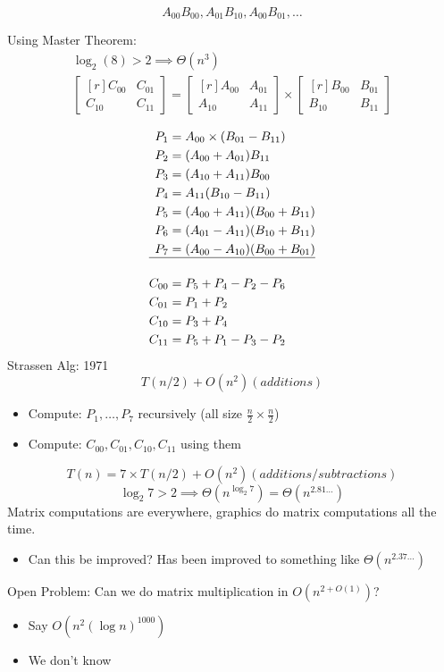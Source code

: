 \documentclass[11pt]{article}
\begin{document}
\begin{equation*}
A_{00}B_{00},A_{01}B_{10},A_{00}B_{01}, \ldots
\end{equation*}

Using Master Theorem:
\begin{align*}
\log_2(8)>2 \implies \Theta(n^3)
\\
\begin{bmatrix*}[r] 
C_{00} & C_{01} \\ C_{10} & C_{11} 
\end{bmatrix*} 
= 
\begin{bmatrix*}[r]
A_{00} & A_{01} \\ A_{10} & A_{11} 
\end{bmatrix*} 
\times 
\begin{bmatrix*}
[r]B_{00} & B_{01} \\ B_{10} & B_{11}
\end{bmatrix*}
\end{align*}

\begin{align*}
P_1 & = A_{00}\times (B_{01}-B_{11})
\\ P_2 & = (A_{00}+A_{01})B_{11}
\\ P_3 & = (A_{10}+A_{11})B_{00}
\\ P_4 & = A_{11}(B_{10}-B_{11})
\\P_5 & = (A_{00}+A_{11})(B_{00}+B_{11})
\\P_6 & = (A_{01}-A_{11})(B_{10}+B_{11})
\\ P_7 & = (A_{00}-A_{10})(B_{00}+B_{01})
\\ \hline
\\ C_{00} & = P_5+P_4-P_2-P_6
\\ C_{01} & = P_1+P_2
\\ C_{10} & = P_3+P_4
\\ C_{11} & = P_5+P_1-P_3-P_2
\end{align*}
Strassen Alg: 1971
$$ T(n/2)+O(n^2) (additions)$$
\begin{itemize}
\item Compute: \(P_1,\ldots,P_7\) recursively (all size \(\frac{n}{2}\times \frac{n}{2}\))
\item Compute: \(C_{00}, C_{01},C_{10},C_{11}\) using them
\end{itemize}
$$T(n)=7 \times T(n/2)+O(n^2)(additions/subtractions)$$
$$\log_2 7 > 2 \implies \Theta (n^{\log_2 7})=\Theta(n^{2.81\ldots})$$
Matrix computations are everywhere, graphics do matrix computations all the time. 
\begin{itemize}
\item Can this be improved? Has been improved to something like \(\Theta(n^{2.37\ldots})\)
\end{itemize}
Open Problem: Can we do matrix multiplication in \(O(n^{2+O(1)})\)?
\begin{itemize}
\item Say \(O(n^2(\log n)^{1000})\)
\item We don't know
\end{itemize}
\end{document}
